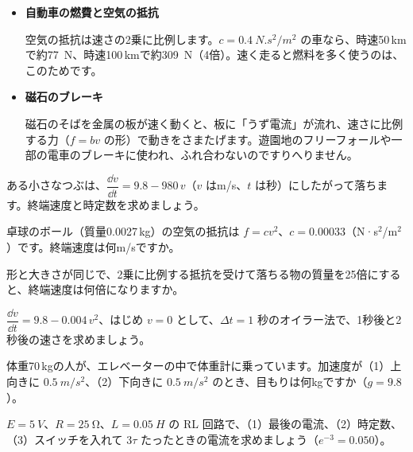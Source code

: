 \begin{butsuri}
\begin{itemize}[leftmargin=1.2\zw, itemsep=3pt, topsep=0pt, label={\color{bkPurple}●}]
\item \textbf{自動車の燃費と空気の抵抗}\par\noindent 空気の抵抗は速さの2乗に比例します。$c=\qty{0.4}{N.s^2/m^2}$ の車なら、時速50\,kmで約\qty{77}{N}、時速100\,kmで約\qty{309}{N}（4倍）。速く走ると燃料を多く使うのは、このためです。
\item \textbf{磁石のブレーキ}\par\noindent 磁石のそばを金属の板が速く動くと、板に「うず電流」が流れ、速さに比例する力（$f=bv$ の形）で動きをさまたげます。遊園地のフリーフォールや一部の電車のブレーキに使われ、ふれ合わないのですりへりません。
\end{itemize}
\end{butsuri}

\bkendproblems
{}

\bkproblem ある小さなつぶは、$\dfrac{\dd v}{\dd t}=9.8-980\,v$（$v$ はm/s、$t$ は秒）にしたがって落ちます。終端速度と時定数を求めましょう。

\bkproblem 卓球のボール（質量0.0027\,kg）の空気の抵抗は $f=cv^2$、$c=0.00033$（N·s$^2$/m$^2$）です。終端速度は何m/sですか。

\bkproblem 形と大きさが同じで、2乗に比例する抵抗を受けて落ちる物の質量を25倍にすると、終端速度は何倍になりますか。

\bkproblem $\dfrac{\dd v}{\dd t}=9.8-0.004\,v^2$、はじめ $v=0$ として、$\Delta t=1$ 秒のオイラー法で、1秒後と2秒後の速さを求めましょう。

\bkproblem 体重70\,kgの人が、エレベーターの中で体重計に乗っています。加速度が（1）上向きに $\qty{0.5}{m/s^2}$、（2）下向きに $\qty{0.5}{m/s^2}$ のとき、目もりは何kgですか（$g=9.8$）。

\bkproblem $E=\qty{5}{V}$、$R=\qty{25}{\ohm}$、$L=\qty{0.05}{H}$ の RL 回路で、（1）最後の電流、（2）時定数、（3）スイッチを入れて $3\tau$ たったときの電流を求めましょう（$e^{-3}=0.050$）。


